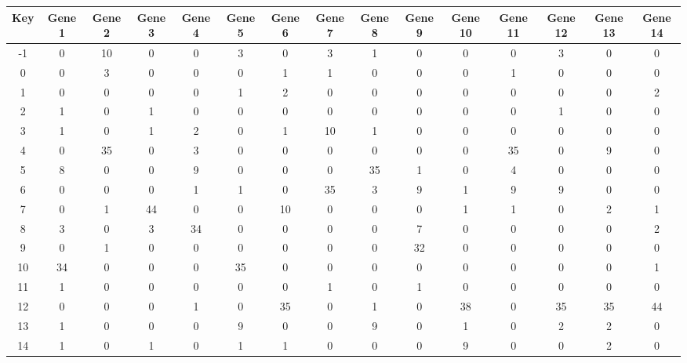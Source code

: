 \begin{tabular}{|c|c|c|c|c|c|c|c|c|c|c|c|c|c|c|}
\hline
Key & Gene 1 & Gene 2 & Gene 3 & Gene 4 & Gene 5 & Gene 6 & Gene 7 & Gene 8 & Gene 9 & Gene 10 & Gene 11 & Gene 12 & Gene 13 & Gene 14 \\
\hline
-1 & 0 & 10 & 0 & 0 & 3 & 0 & 3 & 1 & 0 & 0 & 0 & 3 & 0 & 0 \\
0 & 0 & 3 & 0 & 0 & 0 & 1 & 1 & 0 & 0 & 0 & 1 & 0 & 0 & 0 \\
1 & 0 & 0 & 0 & 0 & 1 & 2 & 0 & 0 & 0 & 0 & 0 & 0 & 0 & 2 \\
2 & 1 & 0 & 1 & 0 & 0 & 0 & 0 & 0 & 0 & 0 & 0 & 1 & 0 & 0 \\
3 & 1 & 0 & 1 & 2 & 0 & 1 & 10 & 1 & 0 & 0 & 0 & 0 & 0 & 0 \\
4 & 0 & 35 & 0 & 3 & 0 & 0 & 0 & 0 & 0 & 0 & 35 & 0 & 9 & 0 \\
5 & 8 & 0 & 0 & 9 & 0 & 0 & 0 & 35 & 1 & 0 & 4 & 0 & 0 & 0 \\
6 & 0 & 0 & 0 & 1 & 1 & 0 & 35 & 3 & 9 & 1 & 9 & 9 & 0 & 0 \\
7 & 0 & 1 & 44 & 0 & 0 & 10 & 0 & 0 & 0 & 1 & 1 & 0 & 2 & 1 \\
8 & 3 & 0 & 3 & 34 & 0 & 0 & 0 & 0 & 7 & 0 & 0 & 0 & 0 & 2 \\
9 & 0 & 1 & 0 & 0 & 0 & 0 & 0 & 0 & 32 & 0 & 0 & 0 & 0 & 0 \\
10 & 34 & 0 & 0 & 0 & 35 & 0 & 0 & 0 & 0 & 0 & 0 & 0 & 0 & 1 \\
11 & 1 & 0 & 0 & 0 & 0 & 0 & 1 & 0 & 1 & 0 & 0 & 0 & 0 & 0 \\
12 & 0 & 0 & 0 & 1 & 0 & 35 & 0 & 1 & 0 & 38 & 0 & 35 & 35 & 44 \\
13 & 1 & 0 & 0 & 0 & 9 & 0 & 0 & 9 & 0 & 1 & 0 & 2 & 2 & 0 \\
14 & 1 & 0 & 1 & 0 & 1 & 1 & 0 & 0 & 0 & 9 & 0 & 0 & 2 & 0 \\
\hline
\end{tabular}